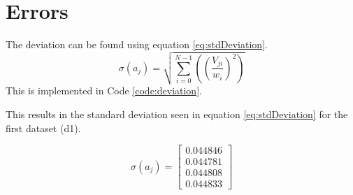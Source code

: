 \section{Errors}
The deviation can be found using equation \ref{eq:stdDeviation}.
\[
\sigma\left(a_j\right) = \sqrt{ \sum_{i=0}^{N-1} \left( \left( \frac{V_{ji}}{w_i}\right)^2\right) }
\label{eq:stdDeviation}
\]
This is implemented in Code \ref{code:deviation}.


This results in the standard deviation seen in equation \ref{eq:stdDeviation} for the first dataset (d1).

\begin{equation}
\sigma\left(a_j\right) = 
\left[
\begin{array}{c}
 0.044846 \\
 0.044781 \\
 0.044808 \\
 0.044833
\end{array}
\right]
\label{eq:stdDeviation}
\end{equation}